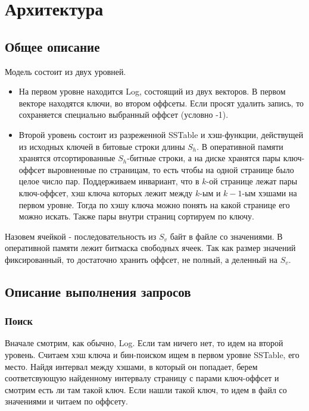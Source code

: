 \section*{Архитектура}
  \subsection*{Общее описание}
      Модель состоит из двух уровней. 
      \begin{itemize} 
      \item 
        На первом уровне находится Log, состоящий из двух векторов. В первом векторе находятся ключи, во втором оффсеты. Если просят удалить запись, то сохраняется специально выбранный оффсет (условно -1).
      \item
        Второй уровень состоит из разреженной SSTable и хэш-функции, действущей из исходных ключей в битовые строки длины $S_h$.
        В оперативной памяти хранятся отсортированные $S_h$-битные строки, а на диске хранятся пары ключ-оффсет выровненные по страницам, 
        то есть чтобы на одной странице было целое число пар. Поддерживаем инвариант, что в $k$-ой странице лежат пары ключ-оффсет, хэш ключа которых лежит между $k$-ым и $k-1$-ым хэшами на первом уровне. 
        Тогда по хэшу ключа можно понять на какой странице его можно искать. Также пары внутри страниц сортируем по ключу.
      \end{itemize}

      Назовем ячейкой - последовательность из $S_v$ байт в файле со значениями. В оперативной памяти лежит битмаска свободных ячеек. 
      Так как размер значений фиксированный, то достаточно хранить оффсет, не полный, а деленный на $S_v$.

    \subsection*{Описание выполнения запросов}
      \subsubsection*{Поиск}
        Вначале смотрим, как обычно, Log. Если там ничего нет, то идем на второй уровень. 
        Считаем хэш ключа и бин-поиском ищем в первом уровне SSTable, его место. 
        Найдя интервал между хэшами, в который он попадает, берем соответсвующую найденному интервалу страницу с парами ключ-оффсет и смотрим есть ли там такой ключ. 
        Если нашли такой ключ, то идем в файл со значениями и читаем по оффсету.


